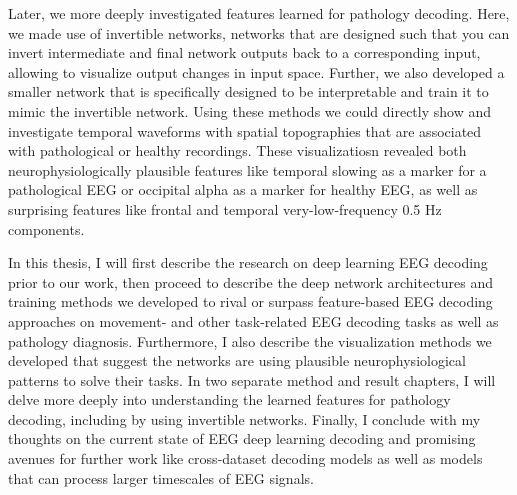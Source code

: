 Later, we more deeply investigated features learned for pathology
decoding. Here, we made use of invertible networks, networks that are
designed such that you can invert intermediate and final network outputs
back to a corresponding input, allowing to visualize output changes in
input space. Further, we also developed a smaller network that is
specifically designed to be interpretable and train it to mimic the
invertible network. Using these methods we could directly show and
investigate temporal waveforms with spatial topographies that are
associated with pathological or healthy recordings. These visualizatiosn
revealed both neurophysiologically plausible features like temporal
slowing as a marker for a pathological EEG or occipital alpha as a
marker for healthy EEG, as well as surprising features like frontal and
temporal very-low-frequency 0.5 Hz components.

    In this thesis, I will first describe the research on deep learning EEG
decoding prior to our work, then proceed to describe the deep network
architectures and training methods we developed to rival or surpass
feature-based EEG decoding approaches on movement- and other
task-related EEG decoding tasks as well as pathology diagnosis.
Furthermore, I also describe the visualization methods we developed that
suggest the networks are using plausible neurophysiological patterns to
solve their tasks. In two separate method and result chapters, I will
delve more deeply into understanding the learned features for pathology
decoding, including by using invertible networks. Finally, I conclude
with my thoughts on the current state of EEG deep learning decoding and
promising avenues for further work like cross-dataset decoding models as
well as models that can process larger timescales of EEG signals.

